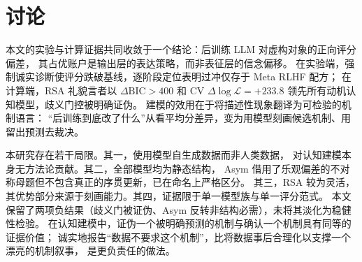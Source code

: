 \documentclass[11pt,a4paper]{ctexart}
\begin{document}
\section{讨论}

本文的实验与计算证据共同收敛于一个结论：后训练 LLM 对虚构对象的正向评分偏差，
其占优账户是输出层的表达策略，而非表征层的信念偏移。
在实验端，强制诚实诊断使评分跌破基线，逐阶段定位表明过冲仅存于 Meta RLHF 配方；
在计算端，RSA 礼貌言者以 $\Delta\mathrm{BIC} > 400$ 和
CV $\Delta\log\mathcal{L} = +233.8$ 领先所有动机认知模型，歧义门控被明确证伪。
建模的效用在于将描述性现象翻译为可检验的机制语言：
``后训练到底改了什么''从看平均分差异，变为用模型刻画候选机制、用留出预测去裁决。

本研究存在若干局限。其一，使用模型自生成数据而非人类数据，
对认知建模本身无方法论贡献。其二，全部模型均为静态结构，
Asym 借用了乐观偏差的不对称母题但不包含真正的序贯更新，已在命名上严格区分。
其三，RSA 较为灵活，其优势部分来源于刻画能力。其四，证据限于单一模型族与单一评分范式。
本文保留了两项负结果（歧义门被证伪、Asym 反转非结构必需），未将其淡化为稳健性检验。
在认知建模中，证伪一个被明确预测的机制与确认一个机制具有同等的证据价值；
诚实地报告``数据不要求这个机制''，比将数据事后合理化以支撑一个漂亮的机制叙事，
是更负责任的做法。


\nocite{*}

\end{document}
